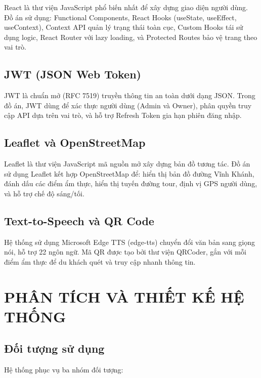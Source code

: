 \documentclass[a4paper,13pt]{report}
\begin{document}
React là thư viện JavaScript phổ biến nhất để xây dựng giao diện người dùng. Đồ án sử dụng: Functional Components, React Hooks (useState, useEffect, useContext), Context API quản lý trạng thái toàn cục, Custom Hooks tái sử dụng logic, React Router với lazy loading, và Protected Routes bảo vệ trang theo vai trò.

\section{JWT (JSON Web Token)}

JWT là chuẩn mở (RFC 7519) truyền thông tin an toàn dưới dạng JSON. Trong đồ án, JWT dùng để xác thực người dùng (Admin và Owner), phân quyền truy cập API dựa trên vai trò, và hỗ trợ Refresh Token gia hạn phiên đăng nhập.

\section{Leaflet và OpenStreetMap}

Leaflet là thư viện JavaScript mã nguồn mở xây dựng bản đồ tương tác. Đồ án sử dụng Leaflet kết hợp OpenStreetMap để: hiển thị bản đồ đường Vĩnh Khánh, đánh dấu các điểm ẩm thực, hiển thị tuyến đường tour, định vị GPS người dùng, và hỗ trợ chế độ sáng/tối.

\section{Text-to-Speech và QR Code}

Hệ thống sử dụng Microsoft Edge TTS (edge-tts) chuyển đổi văn bản sang giọng nói, hỗ trợ 22 ngôn ngữ. Mã QR được tạo bởi thư viện QRCoder, gắn với mỗi điểm ẩm thực để du khách quét và truy cập nhanh thông tin.

\chapter{PHÂN TÍCH VÀ THIẾT KẾ HỆ THỐNG}

\section{Đối tượng sử dụng}

Hệ thống phục vụ ba nhóm đối tượng:
\end{document}
